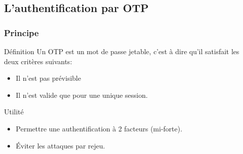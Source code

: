 \documentclass[xcolor=table]{beamer}
\begin{document}
\subsection{L'authentification par OTP}

\begin{frame}
\frametitle{Principe}
\begin{block}{Définition}
    Un OTP est un mot de passe jetable, c'est à dire qu'il satisfait les deux 
  critères suivants:
  \begin{itemize}
    \item Il n'est pas prévisible
    \item Il n'est valide que pour une unique session.
  \end{itemize}
\end{block}

\begin{block}{Utilité}
  \begin{itemize}
    \item Permettre une authentification à 2 facteurs (mi-forte).
    \item Éviter les attaques par rejeu.
  \end{itemize}
\end{block}
\end{frame}
\end{document}
